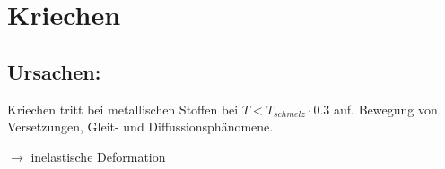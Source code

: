 \section{Kriechen}
    \subsection{Ursachen:}
        Kriechen tritt bei metallischen Stoffen bei $ T < T_{schmelz} \cdot 0.3  $ auf.
        Bewegung von Versetzungen, Gleit- und Diffussionsphänomene. 
        
        $\rightarrow$ inelastische Deformation  
    
\TODO{}